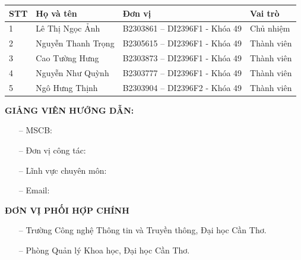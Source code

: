 \clearpage\restoregeometry
{}

\begingroup
\fontsize{13pt}{16pt}\selectfont
{}

\begin{longtable}{P{.05\textwidth}P{.31\textwidth}P{.29\textwidth}P{.22\textwidth}}
\toprule
STT & Họ và tên & Đơn vị & Vai trò \\
\midrule
\endhead

1 & Lê Thị Ngọc Ảnh
  & B2303861 -- DI2396F1 - Khóa 49
  & Chủ nhiệm \\

2 & Nguyễn Thanh Trọng
  & B2305615 -- DI2396F1 - Khóa 49
  & Thành viên \\

3 & Cao Tường Hưng
  & B2303873 -- DI2396F1 - Khóa 49
  & Thành viên \\

4 & Nguyễn Như Quỳnh
  & B2303777 -- DI2396F1 - Khóa 49
  & Thành viên \\

5 & Ngô Hưng Thịnh
  & B2303904 -- DI2396F2 - Khóa 49
  & Thành viên \\

\bottomrule
\end{longtable}

\vspace{4mm}
\noindent\begin{minipage}{\textwidth}
\noindent
\textbf{GIẢNG VIÊN HƯỚNG DẪN:} \SupervisorName
\par

\vspace{2mm}
\begin{itemize}
    \setlength{\itemsep}{2pt}
    \setlength{\topsep}{2pt}
    \setlength{\parsep}{0pt}

    \item[--] MSCB: \SupervisorCode

    \item[--] Đơn vị công tác: \SupervisorUnit

    \item[--] Lĩnh vực chuyên môn: \SupervisorDomain

    \item[--] Email: \SupervisorEmail
\end{itemize}
\end{minipage}

\vspace{4mm}
\noindent
\textbf{ĐƠN VỊ PHỐI HỢP CHÍNH}
\par

\vspace{2mm}
\begin{itemize}
    \setlength{\itemsep}{2pt}
    \setlength{\topsep}{2pt}
    \setlength{\parsep}{0pt}

    \item[--] Trường Công nghệ Thông tin và Truyền thông,
    Đại học Cần Thơ.

    \item[--] Phòng Quản lý Khoa học,
    Đại học Cần Thơ.
\end{itemize}

\endgroup
